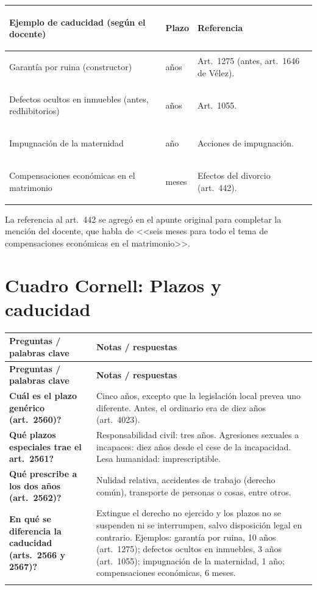\documentclass[12pt,oneside]{book}
\newenvironment{cornell}{%
  \par\medskip\noindent
  \begin{longtable}{>{\raggedright\arraybackslash}p{0.25\textwidth}>{\raggedright\arraybackslash}p{0.69\textwidth}}
  \toprule
  \textbf{Preguntas / palabras clave} & \textbf{Notas / respuestas} \\
  \midrule
  \endfirsthead
  \toprule
  \textbf{Preguntas / palabras clave} & \textbf{Notas / respuestas} \\
  \midrule
  \endhead
}{%
  \bottomrule
  \end{longtable}
}
\newcommand{\cq}[2]{\textbf{#1} & #2 \\ \addlinespace[0.5em]}
\newcommand{\cresumen}[1]{\midrule \multicolumn{2}{p{0.94\textwidth}}{\textbf{Resumen:} #1} \\}
\begin{document}
\begin{table}[H]
\centering\small
\begin{tabularx}{\textwidth}{>{\bfseries\raggedright\arraybackslash}p{4.6cm}>{\raggedright\arraybackslash}p{1.8cm}>{\raggedright\arraybackslash}X}
\toprule
Ejemplo de caducidad (seg\'un el docente) & Plazo & Referencia \\
\midrule
Garant\'ia por ruina (constructor) & 10 a\~nos & Art.\ 1275 (antes, art.\ 1646 de V\'elez). \\
Defectos ocultos en inmuebles (antes, redhibitorios) & 3 a\~nos & Art.\ 1055. \\
Impugnaci\'on de la maternidad & 1 a\~no & Acciones de impugnaci\'on. \\
Compensaciones econ\'omicas en el matrimonio & 6 meses & Efectos del divorcio (art.\ 442). \\
\bottomrule
\end{tabularx}
\end{table}

\begin{note}
La referencia al art.\ 442 se agreg\'o en el apunte original para completar la menci\'on del docente, que habla de <<seis meses para todo el tema de compensaciones econ\'omicas en el matrimonio>>.
\end{note}

\section*{Cuadro Cornell: Plazos y caducidad}

\begin{cornell}
\cq{\textquestiondown Cu\'al es el plazo gen\'erico (art.\ 2560)?}{Cinco a\~nos, excepto que la legislaci\'on local prevea uno diferente. Antes, el ordinario era de diez a\~nos (art.\ 4023).}
\cq{\textquestiondown Qu\'e plazos especiales trae el art.\ 2561?}{Responsabilidad civil: tres a\~nos. Agresiones sexuales a incapaces: diez a\~nos desde el cese de la incapacidad. Lesa humanidad: imprescriptible.}
\cq{\textquestiondown Qu\'e prescribe a los dos a\~nos (art.\ 2562)?}{Nulidad relativa, accidentes de trabajo (derecho com\'un), transporte de personas o cosas, entre otros.}
\cq{\textquestiondown En qu\'e se diferencia la caducidad (arts.\ 2566 y 2567)?}{Extingue el derecho no ejercido y los plazos no se suspenden ni se interrumpen, salvo disposici\'on legal en contrario. Ejemplos: garant\'ia por ruina, 10 a\~nos (art.\ 1275); defectos ocultos en inmuebles, 3 a\~nos (art.\ 1055); impugnaci\'on de la maternidad, 1 a\~no; compensaciones econ\'omicas, 6 meses.}
\cresumen{El plazo gen\'erico baja a cinco a\~nos y existen plazos especiales de tres, dos y diez a\~nos, adem\'as de acciones imprescriptibles. La caducidad extingue el derecho, sin posibilidad de suspensi\'on ni interrupci\'on salvo disposici\'on legal, y lo decisivo es combinar los plazos con el art.\ 2537.}
\end{cornell}
\end{document}
